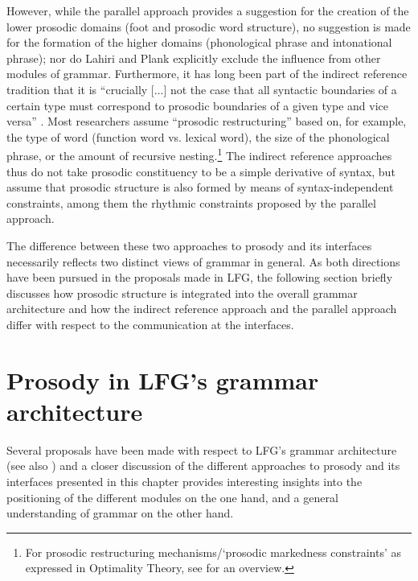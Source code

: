 \documentclass[output=paper,hidelinks]{langscibook}
\begin{document}
However, while the parallel approach provides a suggestion for the creation of the lower prosodic domains (foot and prosodic word structure), no suggestion is made for the formation of the higher domains (phonological phrase and intonational phrase); nor do Lahiri and Plank explicitly exclude the influence from other modules of grammar. Furthermore, it has long been part of
the indirect reference tradition that it is ``crucially [...] not the case that all syntactic boundaries of a certain type must correspond to prosodic boundaries of a given type and vice versa'' \citep[256]{Frota2012}.
Most researchers assume ``prosodic restructuring'' \citep[172]{NesporVogel1986} based on, for example, the type of word (function word vs. lexical word), the size of the phonological phrase, or the amount of recursive nesting.\footnote{For prosodic restructuring mechanisms/`prosodic markedness constraints' as expressed in Optimality Theory, see \citet[468ff]{Selkirk2011} for an overview.} 
 The indirect reference approaches thus do not take prosodic constituency to be a simple derivative of syntax, but assume that prosodic structure is also formed by means of syntax-independent constraints, among them the rhythmic constraints proposed by the parallel approach.%

The difference between these two approaches to prosody and its interfaces necessarily reflects two distinct views of grammar in general. As both directions have been pursued in the proposals made in LFG, the following section briefly discusses how prosodic structure is integrated into the overall grammar architecture and how the indirect reference approach and the parallel approach differ with respect to the communication at the interfaces.


\section{Prosody in LFG's grammar architecture}
\label{sec:Prosody:arch}
Several proposals have been made with respect to LFG's grammar architecture (see also ) and a closer discussion of the different approaches to prosody and its interfaces presented in this chapter provides interesting insights into the positioning of the different modules on the one hand, and a general understanding of grammar on the other hand.
\end{document}
